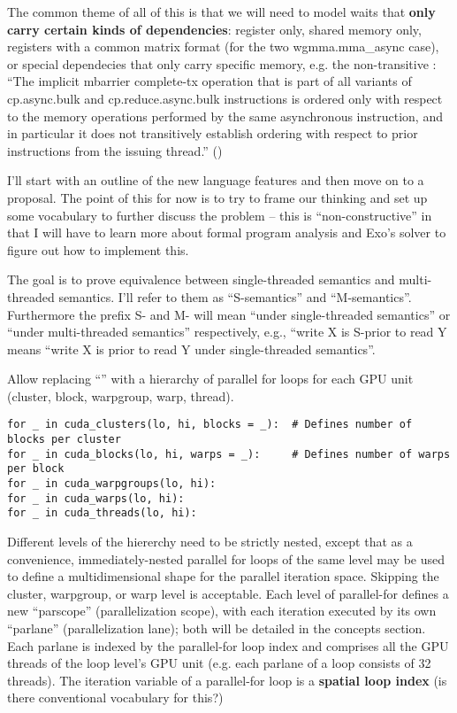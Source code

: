 The common theme of all of this is that we will need to model waits that \textbf{only carry certain kinds of dependencies}: register only, shared memory only, registers with a common matrix format (for the two wgmma.mma\_async case), or special dependecies that only carry specific memory, e.g. the non-transitive \completeTxOperation: ``The implicit mbarrier complete-tx operation that is part of all variants of cp.async.bulk and cp.reduce.async.bulk instructions is ordered only with respect to the memory operations performed by the same asynchronous instruction, and in particular it does not transitively establish ordering with respect to prior instructions from the issuing thread.'' ()

\filbreak
{}

I'll start with an outline of the new language features and then move on to a proposal.
The point of this for now is to try to frame our thinking and set up some vocabulary to further discuss the problem -- this is ``non-constructive'' in that I will have to learn more about formal program analysis and Exo's solver to figure out how to implement this.

\filbreak
The goal is to prove equivalence between single-threaded semantics and multi-threaded semantics.
I'll refer to them as ``S-semantics'' and ``M-semantics''.
Furthermore the prefix S- and M- will mean ``under single-threaded semantics'' or ``under multi-threaded semantics'' respectively, e.g., ``write X is S-prior to read Y means ``write X is prior to read Y under single-threaded semantics''.

\filbreak
{}

 Allow replacing ``'' with a hierarchy of parallel for loops for each GPU unit (cluster, block, warpgroup, warp, thread).

\filbreak
{\color{lightttColor}
\begin{verbatim}
for _ in cuda_clusters(lo, hi, blocks = _):  # Defines number of blocks per cluster
for _ in cuda_blocks(lo, hi, warps = _):     # Defines number of warps per block
for _ in cuda_warpgroups(lo, hi):
for _ in cuda_warps(lo, hi):
for _ in cuda_threads(lo, hi):
\end{verbatim}
}

\filbreak
Different levels of the hiererchy need to be strictly nested, except that as a convenience, immediately-nested parallel for loops of the same level may be used to define a multidimensional shape for the parallel iteration space.
Skipping the cluster, warpgroup, or warp level is acceptable.
Each level of parallel-for defines a new ``parscope'' (parallelization scope), with each iteration executed by its own ``parlane'' (parallelization lane); both will be detailed in the concepts section.
Each parlane is indexed by the parallel-for loop index and comprises all the GPU threads of the loop level's GPU unit (e.g. each parlane of a  loop consists of 32 threads).
The iteration variable of a parallel-for loop is a \textbf{spatial loop index} (is there conventional vocabulary for this?)

